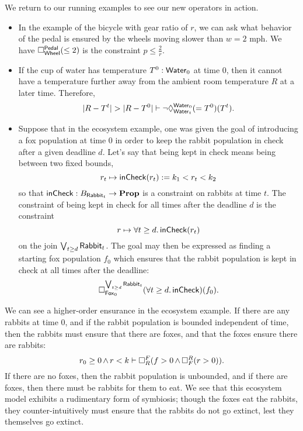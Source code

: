     \begin{ex}
    We return to our running examples to see our new operators in action.
    \begin{itemize}
        \item In the example of the bicycle with gear ratio of $r$, we can ask what behavior of the pedal is ensured by the wheels moving slower than $w=2$ mph. We have $\ensure{\type{Pedal}}{\type{Wheel}}(\leq 2)$ is the constraint $p\leq \frac{2}{r}$.
        
        \item If the cup of water has temperature $T^0: \type{Water}_0$ at time $0$, then it cannot have a temperature further away from the ambient room temperature $R$ at a later time. Therefore, 
        $$|R - T^t| > |R - T^0| \vdash \neg \compat{\type{Water}_0}{\type{Water}_t}(=T^0)(T^t).$$
        
        \item Suppose that in the ecosystem example, one was given the goal of introducing a fox population at time $0$ in order to keep the rabbit population in check after a given deadline $d$. Let's say that being kept in check means being between two fixed bounds, $$r_t \mapsto \term{inCheck}(r_t) := k_1 < r_t < k_2$$
        so that $\term{inCheck} : B_{\type{Rabbit}_t} \to \Prop$ is a constraint on rabbits at time $t$. The constraint of being kept in check for all times after the deadline $d$ is the constraint
        $$r \mapsto \forall t \geq d.\, \term{inCheck}(r_t)$$
        on the join $\bigvee_{t \geq d} \type{Rabbit}_t$. The goal may then be expressed as finding a starting fox population $f_0$ which ensures that the rabbit population is kept in check at all times after the deadline:
        $$\ensure{\bigvee_{t \geq d} \type{Rabbit}_t}{\type{Fox}_0}(\forall t \geq d.\, \term{inCheck})(f_0).$$   
        \end{itemize}
 \end{ex}
 
\begin{ex}
We can see a higher-order ensurance in the ecosystem example. If there are any rabbits at time $0$, and if the rabbit population is bounded independent of time, then the rabbits must ensure that there are foxes, and that the foxes ensure there are rabbits:
    $$r_0 \geq 0 \meet r < k \vdash \ensure{F}{R} (f > 0 \meet \ensure{R}{F}(r > 0)).$$ 
If there are no foxes, then the rabbit population is unbounded, and if there are foxes, then there must be rabbits for them to eat. We see that this ecosystem model exhibits a rudimentary form of symbiosis; though the foxes eat the rabbits, they counter-intuitively must ensure that the rabbits do not go extinct, lest they themselves go extinct.
\end{ex}
 
